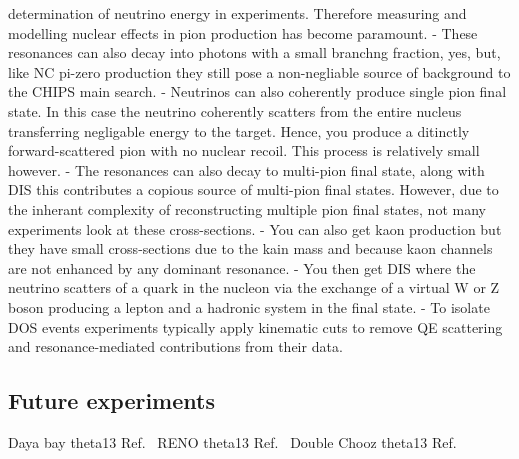 determination of neutrino energy in experiments. Therefore measuring and modelling nuclear effects
in pion production has become paramount.
- These resonances can also decay into photons with a small branchng fraction, yes, but, like NC
pi-zero production they still pose a non-negliable source of background to the CHIPS main search.
- Neutrinos can also coherently produce single pion final state. In this case the neutrino
coherently scatters from the entire nucleus transferring negligable energy to the target. Hence,
you produce a ditinctly forward-scattered pion with no nuclear recoil. This process is relatively
small however.
- The resonances can also decay to multi-pion final state, along with DIS this contributes a
copious source of multi-pion final states. However, due to the inherant complexity of
reconstructing multiple pion final states, not many experiments look at these cross-sections.
- You can also get kaon production but they have small cross-sections due to the kain mass and
because kaon channels are not enhanced by any dominant resonance.
- You then get DIS where the neutrino scatters of a quark in the nucleon via the exchange of a
virtual W or Z boson producing a lepton and a hadronic system in the final state.
- To isolate DOS events experiments typically apply kinematic cuts to remove QE scattering and
resonance-mediated contributions from their data.

\subsection{Future experiments} %
\label{sec:exp_future} %

Daya bay theta13 Ref.~\cite{an2012}
RENO theta13 Ref.~\cite{ahn2012}
Double Chooz theta13 Ref.~\cite{abe2012}

